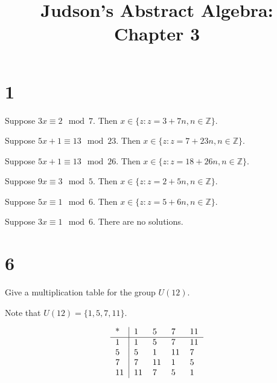 \documentclass[a4paper]{article}
\title{Judson's Abstract Algebra: Chapter 3}
\date{}
\begin{document}
\maketitle

\section*{1}

Suppose $3x \equiv 2 \mod 7$. Then $x \in \{z: z = 3 + 7n, n \in \mathbb{Z}\}$.

\vspace{\baselineskip}

Suppose $5x + 1 \equiv 13 \mod 23$. Then $x \in \{z: z = 7 + 23n, n \in \mathbb{Z}\}$.

\vspace{\baselineskip}

Suppose $5x + 1 \equiv 13 \mod 26$. Then $x \in \{z: z = 18 + 26n, n \in \mathbb{Z}\}$.

\vspace{\baselineskip}

Suppose $9x \equiv 3 \mod 5$. Then $x \in \{z: z = 2 + 5n, n \in \mathbb{Z}\}$.

\vspace{\baselineskip}

Suppose $5x \equiv 1 \mod 6$. Then $x \in \{z: z = 5 + 6n, n \in \mathbb{Z}\}$.

\vspace{\baselineskip}

Suppose $3x \equiv 1 \mod 6$. There are no solutions.


\section*{6}

Give a multiplication table for the group $U(12)$.

\vspace{\baselineskip}

Note that $U(12) = \{ 1, 5, 7, 11 \}.$

$$
\begin{tabular}{ l | l l l l l }
  * & 1 & 5 & 7 & 11 \\
  \hline      
  1 & 1 & 5 & 7 & 11 \\
  5 & 5 & 1 & 11 & 7 \\
  7 & 7 & 11 & 1 & 5 \\
  11 & 11 & 7 & 5 & 1 \\
\end{tabular}
$$
\end{document}
